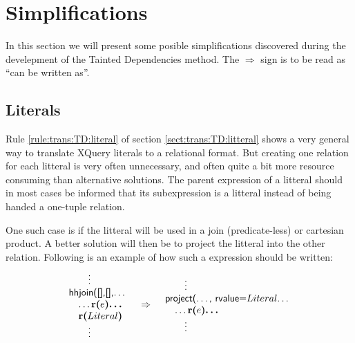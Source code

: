 \section{Simplifications}
\label{sect:trans:TD:simplifications}

In this section we will present some posible simplifications discovered during the develepment of the Tainted
Dependencies method. The $\Rightarrow$ sign is to be read as ``can be written as''. 

\subsection{Literals}
\label{sect:trans:TD:simpl:lit}      

Rule \ref{rule:trans:TD:literal} of section \ref{sect:trans:TD:litteral} shows a very general way to translate
XQuery literals to a relational format. But creating one relation for each litteral is very often unnecessary, and
often quite a bit more resource consuming than alternative solutions. The parent expression of a litteral should
in most cases be informed that its subexpression is a litteral instead of being handed a one-tuple relation.

One such case is if the litteral will be used in a join (predicate-less) or cartesian product. A better solution
will then be to project the litteral into the other relation. Following is an example of how such a expression
should be written:
\begin{equation}
\begin{array}{lcr}
\begin{array}{l}
\mbox{\quad\quad\textsf{\vdots}} \\
\mbox{\textsf{hhjoin([],[],\ldots}} \\ \quad
\mbox{\textsf{\ldots}\textbf{r(}}e\mbox{\textbf{)\ldots}} \\ \quad
\mbox{\textbf{r(}}Literal\mbox{\textbf{)}} \\
\mbox{\quad\quad\textsf{\vdots}}
\end{array}
&
\Rightarrow
&
\begin{array}{l}
\mbox{\quad\quad\textsf{\vdots}} \\
\mbox{\textsf{project(\ldots, rvalue=}}Literal\mbox{\textsf{\ldots}} \\ \quad
\mbox{\textsf{\ldots}\textbf{r(}}e\mbox{\textbf{)\ldots}} \\
\mbox{\quad\quad\textsf{\vdots}}
\end{array}
\end{array}
\label{simpl:trans:TD:joinLit}
\end{equation}

